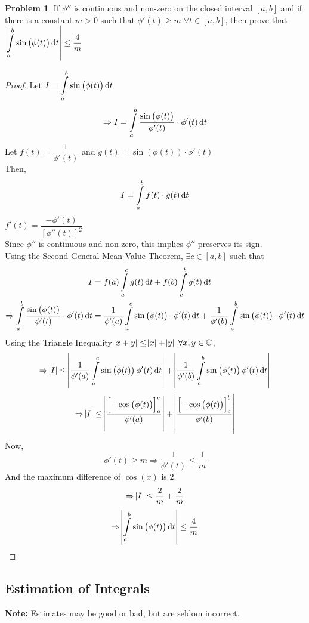 \documentclass[14]{article}
\theoremstyle{definition}
\newtheorem{prob}{Problem}
\theoremstyle{case}
\begin{document}
\begin{prob}
If $\phi''$ is continuous and non-zero on the closed interval $[a, b]$ and if there is a constant $m > 0$ such that $\phi'(t) \geq m \; \forall t \in [a, b]$, then prove that $\abs{\displaystyle\int\limits_a^b \sin\left(\phi(t)\right) \dif t} \leq \dfrac4m$
\begin{proof}
Let $I = \displaystyle\int\limits_a^b \sin\left(\phi(t)\right) \dif t$
\[\Rightarrow I = \int\limits_a^b \dfrac{\sin\left(\phi(t)\right)}{\phi'(t)} \cdot \phi'(t) \dif t\]
Let $f(t) = \dfrac1{\phi'(t)}$ and $g(t) = \sin\left(\phi(t)\right) \cdot \phi'(t)$\\
Then, 
\[I = \int\limits_a^b f(t)\cdot g(t) \dif t\]
$f'(t) = \dfrac{-\phi'(t)}{\left[ \phi''(t) \right]^2}$\\
Since $\phi''$ is continuous and non-zero, this implies $\phi''$ preserves its sign.\\
Using the Second General Mean Value Theorem, $\exists c \in [a, b]$ such that
\begin{align*}
I &= f(a) \int\limits_a^c g(t) \dif t + f(b) \int\limits_c^b g(t) \dif t\\
\Rightarrow \int\limits_a^b \dfrac{\sin\left(\phi(t)\right)}{\phi'(t)} \cdot \phi'(t) \dif t &= \dfrac1{\phi'(a)} \int\limits_a^c \sin\left(\phi(t)\right) \cdot \phi'(t) \dif t + \dfrac1{\phi'(b)} \int\limits_c^b \sin\left(\phi(t)\right) \cdot \phi'(t) \dif t
\end{align*}
Using the Triangle Inequality $\abs{x+y} \leq \abs{x} + \abs{y} \; \forall x, y \in \mathbb{C}$,
\[\Rightarrow \abs{I} \leq \abs{\dfrac1{\phi'(a)}\int\limits_a^c \sin\left(\phi(t)\right)\phi'(t) \dif t} + \abs{\dfrac1{\phi'(b)}\int\limits_c^b \sin\left(\phi(t)\right)\phi'(t) \dif t}\]%
\[\Rightarrow \abs{I} \leq \abs{\dfrac{\left[-\cos\left(\phi(t)\right) \right]_a^c}{\phi'(a)}} + \abs{\dfrac{\left[-\cos\left(\phi(t)\right)\right]_c^b}{\phi'(b)}}\]
Now,
\[\phi'(t) \geq m \Rightarrow \dfrac1{\phi'(t)} \leq \dfrac1{m}\]
And the maximum difference of $\cos(x)$ is $2$.
\[\Rightarrow \abs{I} \leq \dfrac2m + \dfrac2m\]
\[\Rightarrow \abs{\int\limits_a^b \sin\left(\phi(t)\right) \dif t} \leq \dfrac4m\]
\end{proof}
\end{prob}
\pagebreak
\subsection{Estimation of Integrals}
\textbf{Note:} Estimates may be good or bad, but are seldom incorrect.
\end{document}
